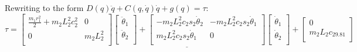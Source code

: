 \documentclass[12pt,norsk,a4paper]{article}
\begin{document}
    Rewriting to the form $D(q)\ddot q + C(q, \dot q)\dot q + g(q) = \tau$:\\
    \[\tau =\underline{\left[\begin{array}{cc}
                \frac{m_1r_1^2}{2}+m_2L_2^2c_2^2 & 0\\
                0 & m_2L_2^2\\
            \end{array}\right]
            \left[\begin{array}{c}
                \ddot \theta_1\\
                \ddot \theta_2\\
            \end{array}\right]
            +\left[\begin{array}{cc}
                -m_2L_2^2c_2s_2\dot\theta_2 & -m_2L_2^2c_2s_2\dot\theta_1\\
                m_2L_2^2c_2s_2\dot\theta_1 & 0\\
            \end{array}\right]
            \left[\begin{array}{c}
                \dot \theta_1\\
                \dot \theta_2\\
            \end{array}\right]
            +\left[\begin{array}{c}
                0\\
                m_2L_2c_29.81\\
            \end{array}\right]}\]

    \newpage
\end{document}
